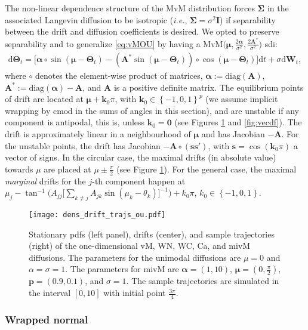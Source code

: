 \documentclass[oneside,11pt]{article}
\newcommand{\lp}{\left(}
\newcommand{\rp}{\right)}
\newcommand{\rd}{\mathrm{d}}
\newcommand{\bmu}{\boldsymbol\mu}
\newcommand{\bs}{\mathbf{s}}
\newcommand{\bk}{\mathbf{k}}
\newcommand{\bp}{\mathbf{p}}
\newcommand{\zero}{\mathbf{0}}
\newcommand{\ba}{\boldsymbol\alpha}
\newcommand{\bTheta}{\boldsymbol\Theta}
\newcommand{\bSigma}{\boldsymbol\Sigma}
\newcommand{\bA}{\mathbf{A}}
\newcommand{\bI}{\mathbf{I}}
\newcommand{\bW}{\mathbf{W}}
\newcommand{\lrb}[1]{\left\{#1\right\}}
\newcommand{\diag}[1]{\mathrm{diag}\lp #1\rp}
\begin{document}
The non-linear dependence structure of the MvM distribution forces $\bSigma$ in the associated Langevin diffusion to be isotropic (\textit{i.e.}, $\bSigma=\sigma^2\bI$) if separability between the drift and diffusion coefficients is desired. We opted to preserve separability and to generalize \eqref{eq:vMOU} by having a $\mathrm{MvM}\big(\bmu,\frac{2\ba}{\sigma^2},\frac{2\bA^*}{\sigma^2}\big)$ sdi:
\begin{align*}
\rd \bTheta_t=\big[\ba\circ \sin(\bmu-\bTheta_t) -(\bA^* \sin(\bmu-\bTheta_t))\circ \cos(\bmu-\bTheta_t)\big]\rd t+\sigma\rd \bW_t,
\end{align*}
where $\circ$ denotes the element-wise product of matrices, $\ba:=\diag{\bA}$, $\bA^*:=\diag{\ba}-\bA$, and $\bA$ is a positive definite matrix. The equilibrium points of drift are located at $\bmu+\bk_0\pi$, with $\bk_0\in\lrb{-1,0,1}^p$ (we assume implicit wrapping by $\mathrm{cmod}$ in the sums of angles in this section), and are unstable if any component is antipodal, this is, unless $\bk_0=\zero$ (see Figures \ref{fig:ld} and \ref{fig:vecdf}). The drift is approximately linear in a neighbourhood of $\bmu$ and has Jacobian $-\bA$. For the unstable points, the drift has Jacobian $-\bA\circ(\bs\bs')$, with $\bs=\cos(\bk_0\pi)$ a vector of signs. In the circular case, the maximal drifts (in absolute value) towards $\mu$ are placed at $\mu\pm\frac{\pi}{2}$ (see Figure \ref{fig:ld}). For the general case, the maximal \textit{marginal} drifts for the $j$-th component happen at $\mu_j-\tan^{-1}\big(A_{jj}\big[\sum_{k\neq j}A_{jk}\sin(\mu_k-\theta_k)\big]^{-1}\big)+k_0\pi$, $k_0\in\lrb{-1,0,1}$.

\begin{figure}[H]
\centering
\texttt{[image: dens\_drift\_trajs\_ou.pdf]}
\caption{\small Stationary pdfs (left panel), drifts (center), and sample trajectories (right) of the one-dimensional vM, WN, WC, Ca, and mivM diffusions. The parameters for the unimodal diffusions are $\mu=0$ and $\alpha=\sigma=1$. The parameters for mivM are $\ba=(1,10)$, $\bmu=(0,\frac{\pi}{2})$, $\bp=(0.9, 0.1)$, and $\sigma=1$. The sample trajectories are simulated in the interval $[0,10]$ with initial point $\frac{3\pi}{4}$. \label{fig:ld}}
\end{figure}

\subsubsection{Wrapped normal}
\end{document}
